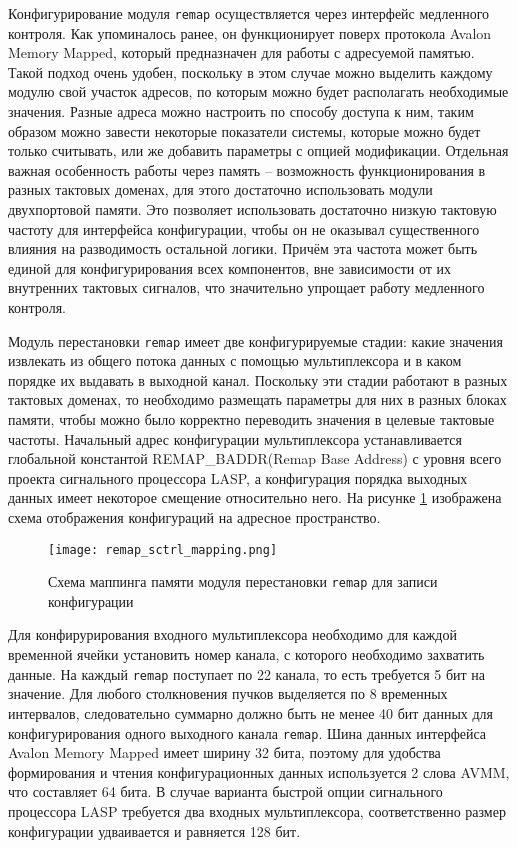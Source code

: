 Конфигурирование модуля \texttt{remap} осуществляется через интерфейс медленного контроля. Как упоминалось ранее, он функционирует поверх протокола Avalon Memory Mapped, который предназначен для работы с адресуемой памятью. Такой подход очень удобен, поскольку в этом случае можно выделить каждому модулю свой участок адресов, по которым можно будет располагать необходимые значения. Разные адреса можно настроить по способу доступа к ним, таким образом можно завести некоторые показатели системы, которые можно будет только считывать, или же добавить параметры с опцией модификации. Отдельная важная особенность работы через память -- возможность функционирования в разных тактовых доменах, для этого достаточно использовать модули двухпортовой памяти. Это позволяет использовать достаточно низкую тактовую частоту для интерфейса конфигурации, чтобы он не оказывал существенного влияния на разводимость остальной логики. Причём эта частота может быть единой для конфигурирования всех компонентов, вне зависимости от их внутренних тактовых сигналов, что значительно упрощает работу медленного контроля.\par
Модуль перестановки \texttt{remap} имеет две конфигурируемые стадии: какие значения извлекать из общего потока данных с помощью мультиплексора и в каком порядке их выдавать в выходной канал. Поскольку эти стадии работают в разных тактовых доменах, то необходимо размещать параметры для них в разных блоках памяти, чтобы можно было корректно переводить значения в целевые тактовые частоты. Начальный адрес конфигурации мультиплексора устанавливается глобальной константой REMAP\_BADDR(Remap Base Address) с уровня всего проекта сигнального процессора LASP, а конфигурация порядка выходных данных имеет некоторое смещение относительно него. На рисунке \ref{fig:remap_sctrl_mapping} изображена схема отображения конфигураций на адресное пространство.\par
\begin{figure}[ht]
    \centering
    \texttt{[image: remap\_sctrl\_mapping.png]}
    \caption{Схема маппинга памяти модуля перестановки \texttt{remap} для записи конфигурации}
    \label{fig:remap_sctrl_mapping}
\end{figure}\par
Для конфирурирования входного мультиплексора необходимо для каждой временной ячейки установить номер канала, с которого необходимо захватить данные. На каждый \texttt{remap} поступает по 22 канала, то есть требуется 5 бит на значение. Для любого столкновения пучков выделяется по 8 временных интервалов, следовательно суммарно должно быть не менее 40 бит данных для конфигурирования одного выходного канала \texttt{remap}. Шина данных интерфейса Avalon Memory Mapped имеет ширину 32 бита, поэтому для удобства формирования и чтения конфигурационных данных используется 2 слова AVMM, что составляет 64 бита. В случае варианта быстрой опции сигнального процессора LASP требуется два входных мультиплексора, соответственно размер конфигурации удваивается и равняется 128 бит.\par
